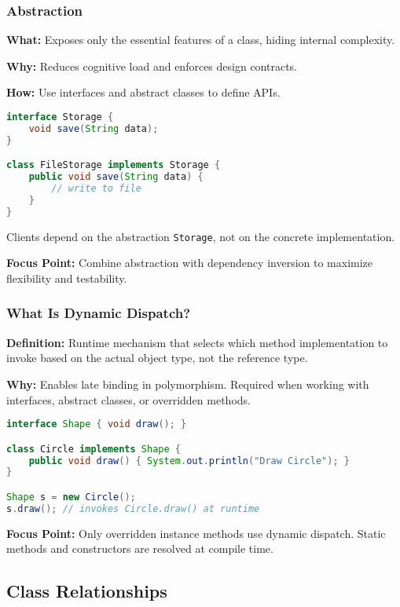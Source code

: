 \documentclass[a4paper,12pt]{article}
\begin{document}
\subsubsection{Abstraction}

\textbf{What:} Exposes only the essential features of a class, hiding internal complexity.

\textbf{Why:} Reduces cognitive load and enforces design contracts.

\textbf{How:} Use interfaces and abstract classes to define APIs.

\begin{lstlisting}[language=Java]
interface Storage {
    void save(String data);
}

class FileStorage implements Storage {
    public void save(String data) {
        // write to file
    }
}
\end{lstlisting}

Clients depend on the abstraction \texttt{Storage}, not on the concrete implementation.

\textbf{Focus Point:} Combine abstraction with dependency inversion to maximize flexibility and testability.



\subsubsection{What Is Dynamic Dispatch?}

\textbf{Definition:} Runtime mechanism that selects which method implementation to invoke based on the actual object type, not the reference type.

\textbf{Why:} Enables late binding in polymorphism. Required when working with interfaces, abstract classes, or overridden methods.

\begin{lstlisting}[language=Java]
interface Shape { void draw(); }

class Circle implements Shape {
    public void draw() { System.out.println("Draw Circle"); }
}

Shape s = new Circle();
s.draw(); // invokes Circle.draw() at runtime
\end{lstlisting}

\textbf{Focus Point:} Only overridden instance methods use dynamic dispatch. Static methods and constructors are resolved at compile time.

\subsection{Class Relationships}
\end{document}
